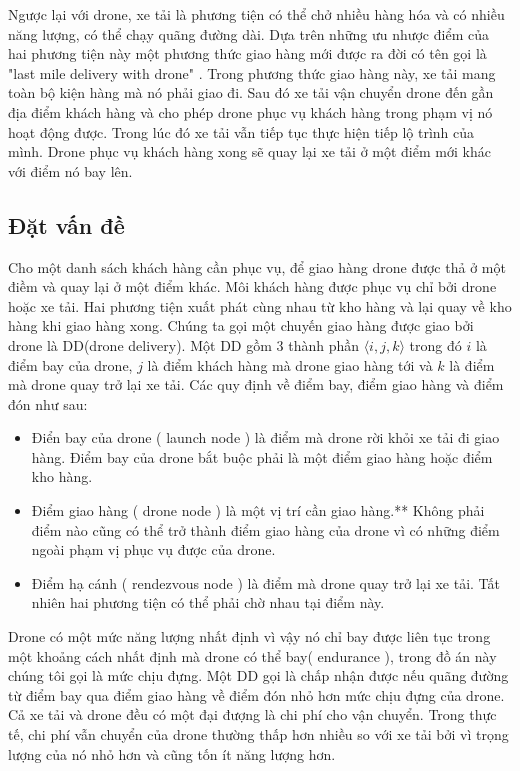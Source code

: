 \documentclass[a4paper,12pt]{report}
\begin{document}
Ngược lại với drone, xe tải là phương tiện có thể chở nhiều hàng hóa và có nhiều năng lượng, có thể chạy quãng đường dài. Dựa trên những ưu nhược điểm của hai phương tiện này một phương thức giao hàng mới được ra đời có tên gọi là "last mile delivery with drone" \cite{bahiwww}. Trong phương thức giao hàng này, xe tải mang toàn bộ kiện hàng mà nó phải giao đi. Sau đó xe tải vận chuyển drone đến gần địa điểm khách hàng và cho phép drone phục vụ khách hàng trong phạm vị nó hoạt động được. Trong lúc đó xe tải vẫn tiếp tục thực hiện tiếp lộ trình của mình.  Drone phục vụ khách hàng xong sẽ quay lại xe tải ở một điểm mới khác với điểm nó bay lên\cite{main}. 
\subsection{Đặt vấn đề}
Cho một danh sách khách hàng cần phục vụ, để giao hàng drone được thả ở một điềm và quay lại ở một điểm khác. Môi khách hàng được phục vụ chỉ bởi drone hoặc xe tải. Hai phương tiện xuất phát cùng nhau từ kho hàng và lại quay về kho hàng khi giao hàng xong. Chúng ta gọi một chuyến giao hàng được giao bởi drone là \ac{DD}(drone delivery). Một \ac{DD} gồm 3 thành phần $\langle i,j,k \rangle$ trong đó $i$ là điểm bay của drone, $j$ là điểm khách hàng mà drone giao hàng tới và $k$ là điểm mà drone quay trở lại xe tải. Các quy định về điểm bay, điểm giao hàng và điểm đón như sau:
\begin{itemize}
\item Điển bay của drone ( launch node ) là điểm mà drone rời khỏi xe tải đi giao hàng. Điểm bay của drone bắt buộc phải là một điểm giao hàng hoặc điểm kho hàng. 
\item Điểm giao hàng ( drone node ) là một vị trí cần giao hàng.** Không phải điểm nào cũng có thể trở thành điểm giao hàng của drone vì có những điểm ngoài phạm vị phục vụ được của drone.
\item Điểm hạ cánh ( rendezvous node ) là điểm mà drone quay trở lại xe tải. Tất nhiên hai phương tiện có thể phải chờ nhau tại điểm này.
\end{itemize}
Drone có một mức năng lượng nhất định vì vậy nó chỉ bay được liên tục trong một khoảng cách nhất định mà drone có thể bay( endurance ), trong đồ án này chúng tôi gọi là mức chịu đựng. Một \ac{DD} gọi là chấp nhận được nếu quãng đường từ điểm bay qua điểm giao hàng về điểm đón nhỏ hơn mức chịu đựng của drone. Cả xe tải và drone đều có một đại đượng là chi phí cho vận chuyển. Trong thực tế, chi phí vẫn chuyển của drone thường thấp hơn nhiều so với xe tải bởi vì trọng lượng của nó nhỏ hơn và cũng tốn ít năng lượng hơn. \\
\end{document}
